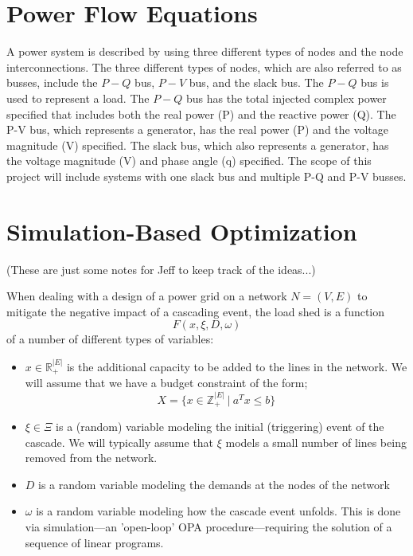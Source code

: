 \section{Power Flow Equations}

A power system is described by using three different types of nodes
and the node interconnections. The three different types of nodes,
which are also referred to as busses, include the $P-Q$ bus, $P-V$ bus,
and the slack bus. The $P-Q$ bus is used to represent a load. The $P-Q$
bus has the total injected complex power specified that includes both
the real power (P) and the reactive power (Q). The P-V bus, which
represents a generator, has the real power (P) and the voltage
magnitude (V) specified. The slack bus, which also represents a
generator, has the voltage magnitude (V) and phase angle (q)
specified. The scope of this project will include systems with one
slack bus and multiple P-Q and P-V busses.



\section{Simulation-Based Optimization}

(These are just some notes for Jeff to keep track of the ideas...)

When dealing with a design of a power grid on a network $N=(V,E)$ to
mitigate the negative impact of a cascading event, the load shed is a
function
\begin{equation}
\label{eq:f}
F(x,\xi,D,\omega)
\end{equation}
of a number of different types of variables:
\begin{itemize}
\item $x \in \mathbb{R}^{|E|}_+$ is the additional capacity to be
  added to the lines in the network.  We will assume that we have a
  budget constraint of the form;
\[ X = \{x \in \mathbb{Z}^{|E|}_+ \ | \ a^Tx \leq b \} \]
\item $\xi \in \Xi$ is a (random) variable modeling the initial
  (triggering) event of the cascade.  We will typically assume that
  $\xi$ models a small number of lines being removed from the
  network. 
\item $D$ is a random variable modeling the demands at the nodes of
  the network 
\item $\omega$ is a random variable modeling how the cascade event
  unfolds.   This is done via simulation---an 'open-loop' OPA
  procedure---requiring the solution of a sequence of linear
  programs. 
\end{itemize}


